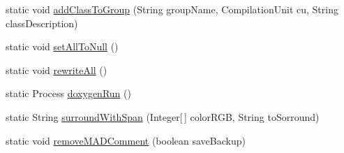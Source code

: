 \begin{DoxyCompactItemize}
\item 
static void \hyperlink{classit_1_1isislab_1_1masonassisteddocumentation_1_1mason_1_1analizer_1_1_global_utility_a7f9ad44f1c41eeafbdb4cd2c4674df40}{add\-Class\-To\-Group} (String group\-Name, Compilation\-Unit cu, String class\-Description)
\item 
static void \hyperlink{classit_1_1isislab_1_1masonassisteddocumentation_1_1mason_1_1analizer_1_1_global_utility_aebc7c44f38977c31459b826f96edde2d}{set\-All\-To\-Null} ()
\item 
static void \hyperlink{classit_1_1isislab_1_1masonassisteddocumentation_1_1mason_1_1analizer_1_1_global_utility_aa40dbda52b50a72ff9589cda19f9bc38}{rewrite\-All} ()
\item 
static Process \hyperlink{classit_1_1isislab_1_1masonassisteddocumentation_1_1mason_1_1analizer_1_1_global_utility_a0b0db96cff45244361ff11e4e176b420}{doxygen\-Run} ()
\item 
static String \hyperlink{classit_1_1isislab_1_1masonassisteddocumentation_1_1mason_1_1analizer_1_1_global_utility_a34ef4730213af90fec963a5b86f992b4}{surround\-With\-Span} (Integer\mbox{[}$\,$\mbox{]} color\-R\-G\-B, String to\-Sorround)
\item 
static void \hyperlink{classit_1_1isislab_1_1masonassisteddocumentation_1_1mason_1_1analizer_1_1_global_utility_ae376f57af26861bbe969fd2e1181e2e0}{remove\-M\-A\-D\-Comment} (boolean save\-Backup)
\end{DoxyCompactItemize}
